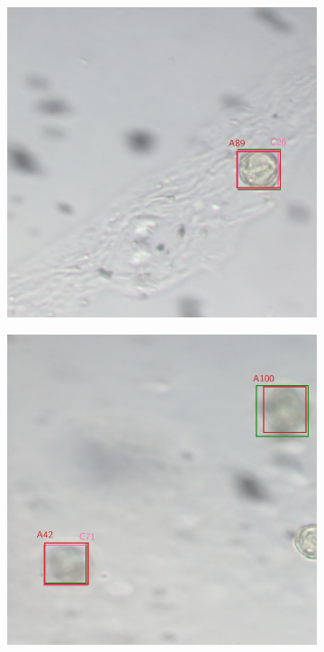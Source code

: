 \begin{figure}[htbp]
  \centering
  \begin{subfigure}[t]{0.4\textwidth}
    \centering
    \includegraphics[width=\textwidth]{figs/results/baseline/Snap-408.pdf}
  \end{subfigure}%
  \hspace*{0.04\textwidth}
  \begin{subfigure}[t]{0.4\textwidth}
    \centering
    \includegraphics[width=\textwidth]{figs/results/baseline/Snap-028.pdf}

\end{subfigure}
\end{figure}
